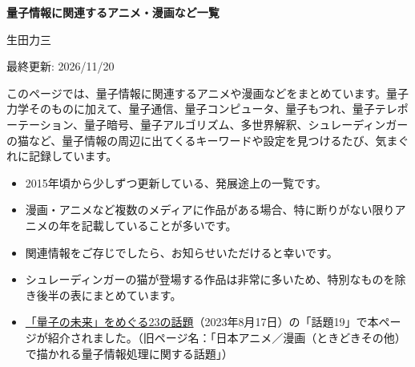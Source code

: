\documentclass[10pt,a4paper,landscape]{ltjsarticle}
\begin{document}
\begin{center}
  {\Large\bfseries 量子情報に関連するアニメ・漫画など一覧\par}
  \vspace{1.5mm}
  生田力三\par
  \vspace{0.7mm}
  {\small\color{black!55}最終更新: 2026/11/20\par}
\end{center}
\vspace{1mm}

このページでは、量子情報に関連するアニメや漫画などをまとめています。量子力学そのものに加えて、量子通信、量子コンピュータ、量子もつれ、量子テレポーテーション、量子暗号、量子アルゴリズム、多世界解釈、シュレーディンガーの猫など、量子情報の周辺に出てくるキーワードや設定を見つけるたび、気まぐれに記録しています。

\vspace{1mm}
\begin{itemize}[leftmargin=5mm,itemsep=1mm,topsep=1mm]
  \item 2015年頃から少しずつ更新している、発展途上の一覧です。
  \item 漫画・アニメなど複数のメディアに作品がある場合、特に断りがない限りアニメの年を記載していることが多いです。
  \item 関連情報をご存じでしたら、お知らせいただけると幸いです。
  \item シュレーディンガーの猫が登場する作品は非常に多いため、特別なものを除き後半の表にまとめています。
  \item \href{https://doi.org/10.18910/92424}{「量子の未来」をめぐる23の話題}（2023年8月17日）の「話題19」で本ページが紹介されました。（旧ページ名：「日本アニメ／漫画（ときどきその他）で描かれる量子情報処理に関する話題」）
\end{itemize}
\end{document}
